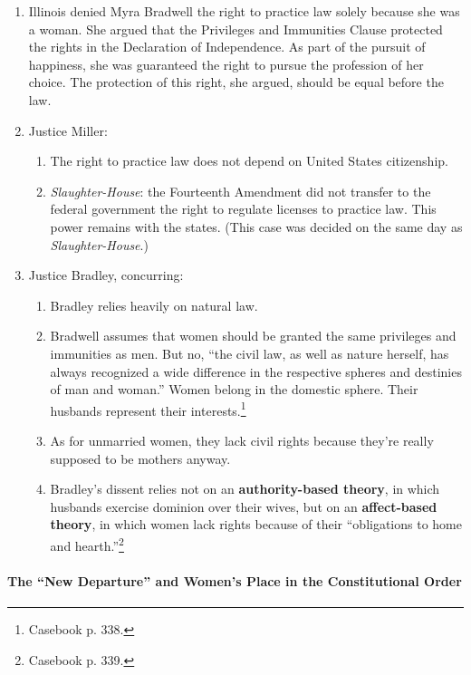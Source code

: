 \begin{enumerate}
    \item Illinois denied Myra Bradwell the right to practice law solely 
    because she was a woman. She argued that the Privileges and Immunities 
    Clause protected the rights in the Declaration of Independence. As part of 
    the pursuit of happiness, she was guaranteed the right to pursue the 
    profession of her choice. The protection of this right, she argued, should 
    be equal before the law.
    \item Justice Miller:
    \begin{enumerate}
        \item The right to practice law does not depend on United States 
        citizenship.
        \item \emph{Slaughter-House}: the Fourteenth Amendment did not 
        transfer to the federal government the right to regulate licenses to 
        practice law. This power remains with the states. (This case was 
        decided on the same day as \emph{Slaughter-House}.)
    \end{enumerate}
    \item Justice Bradley, concurring:
    \begin{enumerate}
        \item Bradley relies heavily on natural law.
        \item Bradwell assumes that women should be granted the same 
        privileges and immunities as men. But no, ``the civil law, as well as 
        nature herself, has always recognized a wide difference in the 
        respective spheres and destinies of man and woman.'' Women belong in 
        the domestic sphere. Their husbands represent their 
        interests.\footnote{Casebook p. 338.}
        \item As for unmarried women, they lack civil rights because they're 
        really supposed to be mothers anyway.
        \item Bradley's dissent relies not on an \textbf{authority-based 
        theory}, in which husbands exercise dominion over their wives, but on 
        an \textbf{affect-based theory}, in which women lack rights because of 
        their ``obligations to home and hearth.''\footnote{Casebook p. 339.}
    \end{enumerate}
\end{enumerate}

\paragraph{The ``New Departure'' and Women's Place in the Constitutional 
Order}

